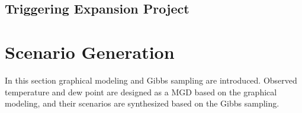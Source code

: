 \documentclass[journal]{IEEEtran} %
\begin{document}
\subsection{Triggering Expansion Project}


















































\newpage

\section{Scenario Generation}

In this section graphical modeling and Gibbs sampling are introduced. Observed temperature and dew point are designed as a MGD based on the graphical modeling, and their scenarios are synthesized based on the Gibbs sampling.








\end{document}
